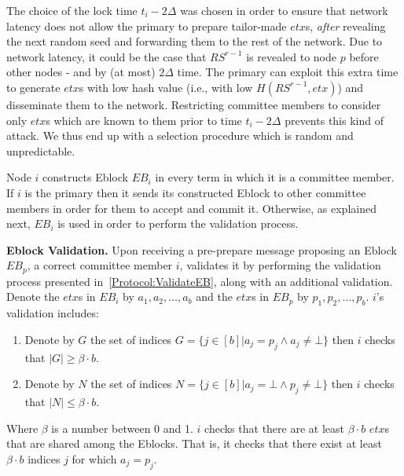 The choice of the lock time $t_i-2\Delta$ was chosen in order to ensure that network latency does not allow the primary to prepare tailor-made $etx$s, \emph{after} revealing the next random seed and forwarding them to the rest of the network. 
Due to network latency, it could be the case that $RS^{r-1}$ is revealed to node $p$ before other nodes - and by (at most) $2\Delta$ time. The primary can exploit this extra time to generate $etx$s with low hash value (i.e., with low $H(RS^{r-1},etx)$) and disseminate them to the network. Restricting committee members to consider only $etx$s which are known to them prior to time $t_i-2\Delta$ prevents this kind of attack. We thus end up with a selection procedure which is random and unpredictable.

Node $i$ constructs Eblock $EB_i$ in every term in which it is a committee member. If $i$ is the primary then it sends its constructed Eblock to other committee members in order for them to accept and commit it. Otherwise, as explained next, $EB_i$ is used in order to perform the validation process. 

\textbf{Eblock Validation.} Upon receiving a pre-prepare message proposing an Eblock $EB_p$, a correct committee member $i$, validates it by performing the validation process presented in~\ref{Protocol:ValidateEB}, along with an additional validation. Denote the $etx$s in $EB_i$ by $a_1,a_2,\dots ,a_b$ and the $etx$s in $EB_p$ by $p_1,p_2,\dots, p_b$. $i$'s validation includes: 
\begin{enumerate}
\item Denote by $G$ the set of indices $G=\{j\in [b]|a_j=p_j \wedge a_j\neq \bot\}$ then $i$ checks that $|G|\geq \beta \cdot b$.
\item Denote by $N$ the set of indices $N=\{j\in [b]|a_j=\bot \wedge p_j\neq \bot\}$ then $i$ checks that $|N| \leq \beta \cdot b$.
\end{enumerate}
Where $\beta$ is a number between 0 and 1. $i$ checks that there are at least $\beta\cdot b$ $etx$s that are shared among the Eblocks. That is, it checks that there exist at least $\beta\cdot b$ indices $j$ for which $a_j=p_j$. 



